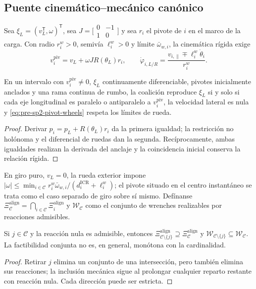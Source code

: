 \subsection{Puente cinemático--mecánico canónico}
\label{app:sp2-canonical-bridge}

Sea $\xi_L=(v_L^{\mathsf T},\omega)^{\mathsf T}$, sea
$J=\bigl[\begin{smallmatrix}0&-1\\1&0\end{smallmatrix}\bigr]$ y sea $r_i$ el
pivote de $i$ en el marco de la carga. Con radio $r_i^w>0$, semivía
$\ell_i^w>0$ y límite $\bar\omega_{w,i}$, la cinemática rígida exige
\begin{equation}
 v_i^{\mathrm{piv}}=v_L+\omega JR(\theta_L)r_i,
 \qquad
 \dot\varphi_{i,L/R}=\frac{v_{i,\parallel}\mp\ell_i^w\dot\theta_i}{r_i^w}.
 \label{eq:pre-sp2-pivot-wheels}
\end{equation}

\begin{proposicion}
\label{prop:pre-sp2-kinematic-equivalence}
En un intervalo con $v_i^{\mathrm{piv}}\ne0$, $\xi_L$ continuamente
diferenciable, pivotes inicialmente anclados y una rama continua de rumbo, la
coalición reproduce $\xi_L$ si y solo si cada eje longitudinal es paralelo o
antiparalelo a $v_i^{\mathrm{piv}}$, la velocidad lateral es nula y
\eqref{eq:pre-sp2-pivot-wheels} respeta los límites de rueda.
\end{proposicion}
\begin{proof}
Derivar $p_i=p_L+R(\theta_L)r_i$ da la primera igualdad; la restricción no
holónoma y el diferencial de ruedas dan la segunda. Recíprocamente, ambas
igualdades realizan la derivada del anclaje y la coincidencia inicial conserva
la relación rígida.
\end{proof}

En giro puro, $v_L=0$, la rueda exterior impone
$|\omega|\leq\min_{i\in\mathcal C}
r_i^w\bar\omega_{w,i}/(d_i^{\mathrm{ICR}}+\ell_i^w)$; el pivote situado en el
centro instantáneo se trata como el caso separado de giro sobre sí mismo.
Defínanse $\Xi_{\mathcal C}^{\mathrm{align}}=\bigcap_{i\in\mathcal C}
\Xi_i^{\mathrm{align}}$ y $\mathcal W_{\mathcal C}$ como el conjunto de
wrenches realizables por reacciones admisibles.

\begin{proposicion}
\label{prop:pre-sp2-opposite-monotonicity}
Si $j\in\mathcal C$ y la reacción nula es admisible, entonces
$\Xi_{\mathcal C\setminus\{j\}}^{\mathrm{align}}\supseteq
\Xi_{\mathcal C}^{\mathrm{align}}$ y
$\mathcal W_{\mathcal C\setminus\{j\}}\subseteq\mathcal W_{\mathcal C}$.
La factibilidad conjunta no es, en general, monótona con la cardinalidad.
\end{proposicion}
\begin{proof}
Retirar $j$ elimina un conjunto de una intersección, pero también elimina sus
reacciones; la inclusión mecánica sigue al prolongar cualquier reparto restante
con reacción nula. Cada dirección puede ser estricta.
\end{proof}

